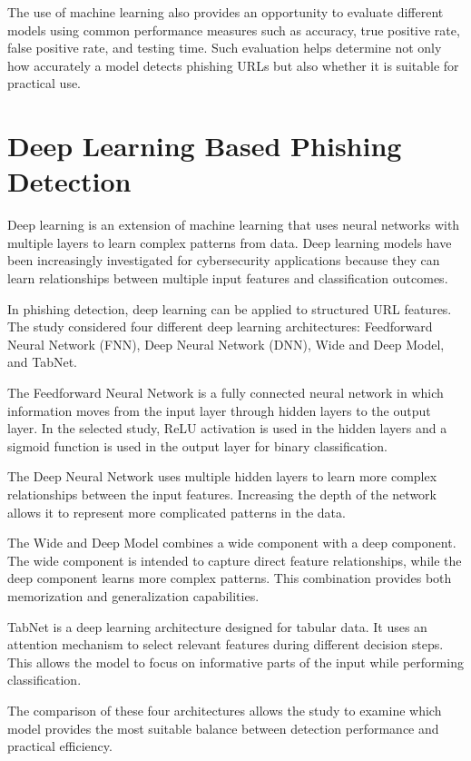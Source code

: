 \documentclass[12pt,a4paper]{report}
\begin{document}
The use of machine learning also provides an opportunity to evaluate different models using common performance measures such as accuracy, true positive rate, false positive rate, and testing time. Such evaluation helps determine not only how accurately a model detects phishing URLs but also whether it is suitable for practical use.

\section{Deep Learning Based Phishing Detection}

Deep learning is an extension of machine learning that uses neural networks with multiple layers to learn complex patterns from data. Deep learning models have been increasingly investigated for cybersecurity applications because they can learn relationships between multiple input features and classification outcomes.

In phishing detection, deep learning can be applied to structured URL features. The study considered four different deep learning architectures: Feedforward Neural Network (FNN), Deep Neural Network (DNN), Wide and Deep Model, and TabNet.

The Feedforward Neural Network is a fully connected neural network in which information moves from the input layer through hidden layers to the output layer. In the selected study, ReLU activation is used in the hidden layers and a sigmoid function is used in the output layer for binary classification.

The Deep Neural Network uses multiple hidden layers to learn more complex relationships between the input features. Increasing the depth of the network allows it to represent more complicated patterns in the data.

The Wide and Deep Model combines a wide component with a deep component. The wide component is intended to capture direct feature relationships, while the deep component learns more complex patterns. This combination provides both memorization and generalization capabilities.

TabNet is a deep learning architecture designed for tabular data. It uses an attention mechanism to select relevant features during different decision steps. This allows the model to focus on informative parts of the input while performing classification.

The comparison of these four architectures allows the study to examine which model provides the most suitable balance between detection performance and practical efficiency.
\end{document}
